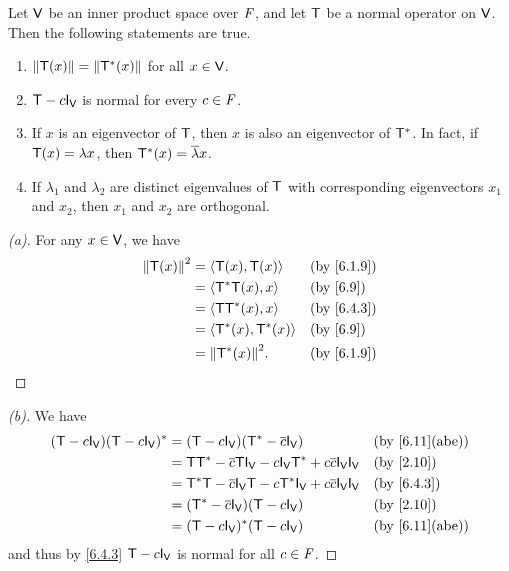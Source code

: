 \begin{thm}\label{6.15}
	Let \(\mathsf{V}\) be an inner product space over \(\mathit{F}\), and let \(\mathsf{T}\) be a normal operator on \(\mathsf{V}\).
	Then the following statements are true.
	\begin{enumerate}
		\item \(\left\lVert\mathsf{T}(x)\right\rVert = \left\lVert\mathsf{T}^*(x)\right\rVert\) for all \(x \in \mathsf{V}\).
		\item \(\T - c \IT[\V]\) is normal for every \(c \in \mathit{F}\).
		\item If \(x\) is an eigenvector of \(\mathsf{T}\), then \(x\) is also an eigenvector of \(\mathsf{T}^*\).
		      In fact, if \(\mathsf{T}(x) = \lambda x\), then \(\mathsf{T}^*(x) = \overline{\lambda} x\).
		\item If \(\lambda_1\) and \(\lambda_2\) are distinct eigenvalues of \(\mathsf{T}\) with corresponding eigenvectors \(x_1\) and \(x_2\), then \(x_1\) and \(x_2\) are orthogonal.
	\end{enumerate}
\end{thm}

\begin{proof}[(a)]
	For any \(x \in \mathsf{V}\), we have
	\begin{align*}
		\norm{\T(x)}^2 & = \inn{\T(x), \T(x)}     &  & \by{6.1.9} \\
		               & = \inn{\T^* \T(x), x}    &  & \by{6.9}   \\
		               & = \inn{\T \T^*(x), x}    &  & \by{6.4.3} \\
		               & = \inn{\T^*(x), \T^*(x)} &  & \by{6.9}   \\
		               & = \norm{\T^*(x)}^2.      &  & \by{6.1.9}
	\end{align*}
\end{proof}

\begin{proof}[(b)]
	We have
	\begin{align*}
		(\T - c \IT[\V]) (\T - c \IT[\V])^* & = (\T - c \IT[\V]) (\T^* - \conj{c} \IT[\V])                                  &  & \by{6.11}[abe] \\
		                                    & = \T \T^* - \conj{c} \T \IT[\V] - c \IT[\V] \T^* + c \conj{c} \IT[\V] \IT[\V] &  & \by{2.10}      \\
		                                    & = \T^* \T - \conj{c} \IT[\V] \T - c \T^* \IT[\V] + c \conj{c} \IT[\V] \IT[\V] &  & \by{6.4.3}     \\
		                                    & = (\T^* - \conj{c} \IT[\V]) (\T - c \IT[\V])                                  &  & \by{2.10}      \\
		                                    & = (\T - c \IT[\V])^* (\T - c \IT[\V])                                         &  & \by{6.11}[abe]
	\end{align*}
	and thus by \cref{6.4.3} \(\T - c \IT[\V]\) is normal for all \(c \in \mathit{F}\).
\end{proof}

